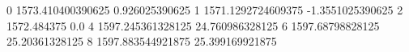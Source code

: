 0 1573.410400390625 0.926025390625
1 1571.1292724609375 -1.3551025390625
2 1572.484375 0.0
4 1597.245361328125 24.760986328125
6 1597.68798828125 25.20361328125
8 1597.883544921875 25.399169921875
